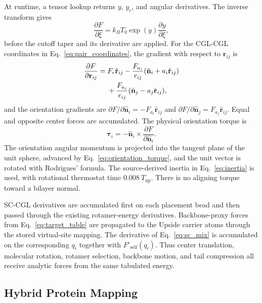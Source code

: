 \documentclass{article}
\begin{document}
At runtime, a tensor lookup returns $y$, $y_r$, and angular derivatives.  The
inverse transform gives
\begin{equation}
\frac{\partial F}{\partial \xi}=k_BT_0\exp(y)
\frac{\partial y}{\partial \xi},
\label{eq:inverse_derivative}
\end{equation}
before the cutoff taper and its derivative are applied.  For the CGL-CGL
coordinates in Eq.~\ref{eq:pair_coordinates}, the gradient with respect to
$\mathbf r_{ij}$ is
\begin{align}
\frac{\partial F}{\partial\mathbf r_{ij}}={}&F_r\hat{\mathbf r}_{ij}
-\frac{F_{a_i}}{r_{ij}}
(\hat{\mathbf n}_i+a_i\hat{\mathbf r}_{ij}) \notag\\
&+\frac{F_{a_j}}{r_{ij}}
(\hat{\mathbf n}_j-a_j\hat{\mathbf r}_{ij}),
\label{eq:pair_gradient}
\end{align}
and the orientation gradients are
$\partial F/\partial\hat{\mathbf n}_i=-F_{a_i}\hat{\mathbf r}_{ij}$ and
$\partial F/\partial\hat{\mathbf n}_j=F_{a_j}\hat{\mathbf r}_{ij}$.  Equal and
opposite center forces are accumulated.  The physical orientation torque is
\begin{equation}
\boldsymbol\tau_i=-\hat{\mathbf n}_i\times
\frac{\partial F}{\partial\hat{\mathbf n}_i}.
\label{eq:orientation_torque}
\end{equation}
The orientation angular momentum is projected into the tangent plane of the
unit sphere, advanced by Eq.~\ref{eq:orientation_torque}, and the unit vector
is rotated with Rodrigues' formula.  The source-derived inertia in
Eq.~\ref{eq:inertia} is used, with rotational thermostat time
$0.008~T_{\mathrm{up}}$.  There is no aligning torque toward a bilayer normal.

SC-CGL derivatives are accumulated first on each placement bead and then
passed through the existing rotamer-energy derivatives.  Backbone-proxy
forces from Eq.~\ref{eq:target_table} are propagated to the Upside carrier
atoms through the stored virtual-site mapping.  The derivative of
Eq.~\ref{eq:sc_mix} is accumulated on the corresponding $q_i$ together with
$F'_{\mathrm{self}}(q_i)$.  Thus center translation, molecular rotation,
rotamer selection, backbone motion, and tail compression all receive analytic
forces from the same tabulated energy.

\subsection{Hybrid Protein Mapping}
\end{document}

